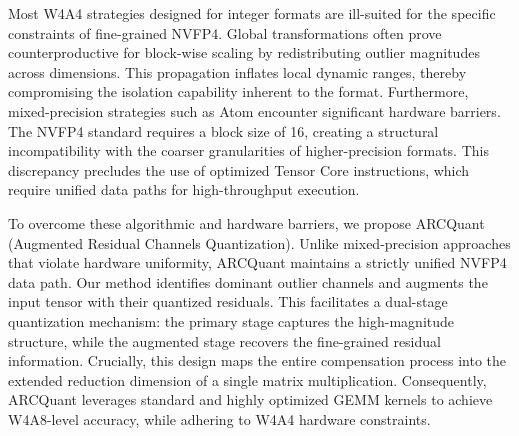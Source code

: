 \documentclass[11pt]{article}
\begin{document}
Most W4A4 strategies designed for integer formats are ill-suited for the specific constraints of fine-grained NVFP4.
Global transformations often prove counterproductive for block-wise scaling by redistributing outlier magnitudes across dimensions.
This propagation inflates local dynamic ranges, thereby compromising the isolation capability inherent to the format.
Furthermore, mixed-precision strategies such as Atom encounter significant hardware barriers.
The NVFP4 standard requires a block size of 16, creating a structural incompatibility with the coarser granularities of higher-precision formats.
This discrepancy precludes the use of optimized Tensor Core instructions, which require unified data paths for high-throughput execution.


To overcome these algorithmic and hardware barriers, we propose ARCQuant (Augmented Residual Channels Quantization). 
Unlike mixed-precision approaches that violate hardware uniformity, ARCQuant maintains a strictly unified NVFP4 data path. 
Our method identifies dominant outlier channels and augments the input tensor with their quantized residuals. 
This facilitates a dual-stage quantization mechanism: the primary stage captures the high-magnitude structure, while the augmented stage recovers the fine-grained residual information. 
Crucially, this design maps the entire compensation process into the extended reduction dimension of a single matrix multiplication. 
Consequently, ARCQuant leverages standard and highly optimized GEMM kernels to achieve W4A8-level accuracy, while adhering to W4A4 hardware constraints.
\end{document}
